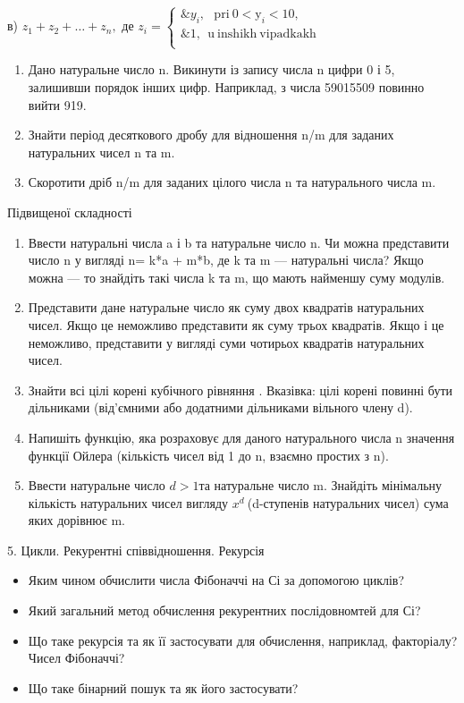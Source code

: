 \documentclass[]{article}
\begin{document}
в) \(z_{1} + z_{2} + \ldots + z_{n},\) де
\(z_{i} = \left\{ \begin{matrix}
\& y_{i},\mathrm{\ \ \ pri\ 0 <}\mathrm{y}_{i} < 10, \\
\& 1,\mathrm{\ \ u\ inshikh\ vipadkakh\ \ \ } \\
\end{matrix} \right.\ \)

\begin{enumerate}
\def\labelenumi{\arabic{enumi})}
\item
  Дано натуральне число n. Викинути із запису числа n цифри 0 і 5,
  залишивши порядок інших цифр. Наприклад, з числа 59015509 повинно
  вийти 919.
\item
  Знайти період десяткового дробу для відношення n/m для заданих
  натуральних чисел n та m.
\item
  Скоротити дріб n/m для заданих цілого числа n та натурального числа m.
\end{enumerate}

Підвищеної складності

\begin{enumerate}
\def\labelenumi{\arabic{enumi})}
\item
  Ввести натуральні числа a і b та натуральне число n. Чи можна
  представити число n у вигляді n= k*a + m*b, де k та m --- натуральні
  числа? Якщо можна --- то знайдіть такі числа k та m, що мають найменшу
  суму модулів.
\item
  Представити дане натуральне число як суму двох квадратів натуральних
  чисел. Якщо це неможливо представити як суму трьох квадратів. Якщо і
  це неможливо, представити у вигляді суми чотирьох квадратів
  натуральних чисел.
\item
  Знайти всі цілі корені кубічного рівняння . Вказівка: цілі корені
  повинні бути дільниками (від'ємними або додатними дільниками вільного
  члену d).
\item
  Напишіть функцію, яка розраховує для даного натурального числа n
  значення функції Ойлера (кількість чисел від 1 до n, взаємно простих з
  n).
\item
  Ввести натуральне число \(d > 1\)та натуральне число m. Знайдіть
  мінімальну кількість натуральних чисел вигляду \(x^{d}\ \)(d-ступенів
  натуральних чисел) сума яких дорівнює m.
\end{enumerate}

5. Цикли. Рекурентні співвідношення. Рекурсія

\begin{itemize}
\item
  Яким чином обчислити числа Фібоначчі на Сі за допомогою циклів?
\item
  Який загальний метод обчислення рекурентних послідовномтей для Сі?
\item
  Що таке рекурсія та як її застосувати для обчислення, наприклад,
  факторіалу? Чисел Фібоначчі?
\item
  Що таке бінарний пошук та як його застосувати?
\end{itemize}
\end{document}
